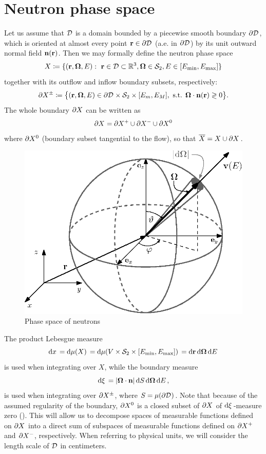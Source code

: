 \section{Neutron phase space} \label{sec:phase}
Let us assume that $\VV$ is a domain bounded by a piecewise smooth boundary $\pV$, which is oriented
at almost every point $\br\in\pV$ (a.e. in $\pV$) by its unit outward normal field $\bn(\br)$.
Then we may formally define the neutron phase space 
$$
  X \coloneqq \{(\br,\bomega,E):\ \br\in \VV\subset\R[3], \bomega\in \Sphere, E \in [\Emin,\Emax]\}
$$
together with its outflow and inflow boundary subsets, respectively:
$$
  \pX[\pm] \coloneqq \bigl\{ (\br,\bomega,E) \in \pV \times \Sphere \times [E_m, E_M], \mbox{ s.t. }
  \bomega\cdot\bn(\br) \gtrless 0 \bigr\}.
$$
The whole boundary $\pX$ can be written as $$ \pX = \pX[+]\cup \pX[-] \cup \pX[0] $$ where $\pX[0]$ (boundary subset
tangential to the flow), so that $\overline X = X \cup \pX$.
\begin{figure}[!hbt]
    \centering \includegraphics[scale=1]{phase_space.eps} \caption[Phase space of neutrons]{Phase space of neutrons}
    \label{fig:phase_space}
\end{figure}
The product Lebesgue measure
\begin{equation}\label{eq:measure}
  \d{x} = \d{\mu(X)} = \d{\mu(V\times\Sphere\times [\Emin,\Emax])} = \d{\br}\d{\bomega}\d{E}
\end{equation}
%
is used when integrating over $X$, 
while the boundary measure
\begin{equation}\label{eq:measure2}
\db = \abs{\bomega\cdot\bn}\d{S}\d{\bomega}\d{E},
\end{equation}
%
is used when integrating over $\pX[\pm]$, where $S = \mu(\pV)$.
Note that
because of the assumed regularity of the boundary, $\pX[0]$ is a closed subset of $\pX$ of
\linebreak\mbox{$\db$-measure} zero (\cite[Chap. XXI, Sec. 2.2]{DautrayLions}). This will allow us to decompose spaces 
of measurable functions defined on $\pX$ into a direct sum of subspaces of measurable functions defined on $\pX[+]$ and 
$\pX[-]$, respectively. When referring to physical units, we will consider the length scale of $\VV$ in centimeters.

